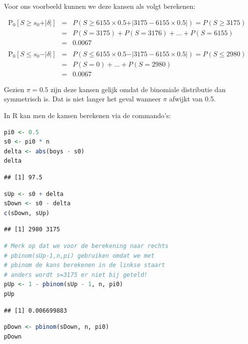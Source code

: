 \documentclass[
  12pt,dutch,coursenotes]{book}
\theoremstyle{definition}
\theoremstyle{definition}
\theoremstyle{definition}
\theoremstyle{definition}
\theoremstyle{remark}
\begin{document}
Voor ons voorbeeld kunnen we deze kansen als volgt berekenen:

\begin{eqnarray*}
\text{P}_0\left[S\geq s_0+ \vert \delta\vert \right] &=& P(S \geq 6155 \times 0.5 + \vert 3175 - 6155 \times 0.5\vert ) = P(S \geq 3175)\\
&= &P(S= 3175) + P(S=3176) + ... + P(S=6155)\\
& =& 0.0067\\\\
\text{P}_0\left[S \leq s_0 - \vert \delta\vert \right] &=& P(S \leq  6155 \times 0.5 - \vert 3175- 6155 \times 0.5\vert) = P(S \leq 2980)\\ &= &P(S=0) + ... + P(S=2980) \\
&=&0.0067
\end{eqnarray*}

Gezien \(\pi=0.5\) zijn deze kansen gelijk omdat de binomiale distributie dan symmetrisch is. Dat is niet langer het geval wanneer \(\pi\) afwijkt van 0.5.

In R kan men de kansen berekenen via de commando's:

\begin{lstlisting}[language=R]
pi0 <- 0.5
s0 <- pi0 * n
delta <- abs(boys - s0)
delta
\end{lstlisting}

\begin{lstlisting}
## [1] 97.5
\end{lstlisting}

\begin{lstlisting}[language=R]
sUp <- s0 + delta
sDown <- s0 - delta
c(sDown, sUp)
\end{lstlisting}

\begin{lstlisting}
## [1] 2980 3175
\end{lstlisting}

\begin{lstlisting}[language=R]
# Merk op dat we voor de berekening naar rechts
# pbinom(sUp-1,n,pi) gebruiken omdat we met
# pbinom de kans berekenen in de linkse staart
# anders wordt s=3175 er niet bij geteld!
pUp <- 1 - pbinom(sUp - 1, n, pi0)
pUp
\end{lstlisting}

\begin{lstlisting}
## [1] 0.006699883
\end{lstlisting}

\begin{lstlisting}[language=R]
pDown <- pbinom(sDown, n, pi0)
pDown
\end{lstlisting}
\end{document}
